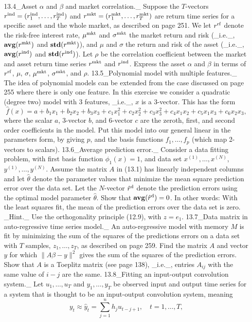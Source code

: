 13.4_Asset \(\alpha\) and \(\beta\) and market correlation._ Suppose the \(T\)-vectors \(r^{\rm ind}=(r^{\rm ind}_{1},\ldots,r^{\rm ind}_{T})\) and \(r^{\rm mkt}=(r^{\rm mkt}_{1},\ldots,r^{\rm mkt}_{T})\) are return time series for a specific asset and the whole market, as described on page 251. We let \(r^{\rm rf}\) denote the risk-free interest rate, \(\mu^{\rm mkt}\) and \(\sigma^{\rm mkt}\) the market return and risk (_i.e._, \({\bf avg}(r^{\rm mkt})\) and \({\bf std}(r^{\rm mkt})\)), and \(\mu\) and \(\sigma\) the return and risk of the asset (_i.e._, \({\bf avg}(r^{\rm ind})\) and \({\bf std}(r^{\rm ind})\)). Let \(\rho\) be the correlation coefficient between the market and asset return time series \(r^{\rm mkt}\) and \(r^{\rm ind}\). Express the asset \(\alpha\) and \(\beta\) in terms of \(r^{\rm rf}\), \(\mu\), \(\sigma\), \(\mu^{\rm mkt}\), \(\sigma^{\rm mkt}\), and \(\rho\).
13.5_Polynomial model with multiple features._ The idea of polynomial models can be extended from the case discussed on page 255 where there is only one feature. In this exercise we consider a quadratic (degree two) model with 3 features, _i.e._, \(x\) is a 3-vector. This has the form \[\hat{f}(x)=a+b_{1}x_{1}+b_{2}x_{2}+b_{3}x_{3}+c_{1}x_{1}^{2}+c_{2}x_{2}^{2}+c _{3}x_{3}^{2}+c_{4}x_{1}x_{2}+c_{5}x_{1}x_{3}+c_{6}x_{2}x_{3},\] where the scalar \(a\), 3-vector \(b\), and 6-vector \(c\) are the zeroth, first, and second order coefficients in the model. Put this model into our general linear in the parameters form, by giving \(p\), and the basis functions \(f_{1},\ldots,f_{p}\) (which map 2-vectors to scalars).
13.6_Average prediction error._ Consider a data fitting problem, with first basis function \(\phi_{1}(x)=1\), and data set \(x^{(1)},\ldots,x^{(N)}\), \(y^{(1)},\ldots,y^{(N)}\). Assume the matrix \(A\) in (13.1) has linearly independent columns and let \(\hat{\theta}\) denote the parameter values that minimize the mean square prediction error over the data set. Let the \(N\)-vector \(\hat{r}^{\rm d}\) denote the prediction errors using the optimal model parameter \(\hat{\theta}\). Show that \({\bf avg}(\hat{r}^{\rm d})=0\). In other words: With the least squares fit, the mean of the prediction errors over the data set is zero. _Hint._ Use the orthogonality principle (12.9), with \(z=e_{1}\).
13.7_Data matrix in auto-regressive time series model._ An auto-regressive model with memory \(M\) is fit by minimizing the sum of the squares of the predictions errors on a data set with \(T\) samples, \(z_{1},\ldots,z_{T}\), as described on page 259. Find the matrix \(A\) and vector \(y\) for which \(\|A\beta-y\|^{2}\) gives the sum of the squares of the prediction errors. Show that \(A\) is a Toeplitz matrix (see page 138), _i.e._, entries \(A_{ij}\) with the same value of \(i-j\) are the same.
13.8_Fitting an input-output convolution system._ Let \(u_{1},\ldots,u_{T}\) and \(y_{1},\ldots,y_{T}\) be observed input and output time series for a system that is thought to be an input-output convolution system, meaning \[y_{t}\approx\hat{y}_{t}=\sum_{j=1}^{n}h_{j}u_{t-j+1},\quad t=1,\ldots,T,\] 